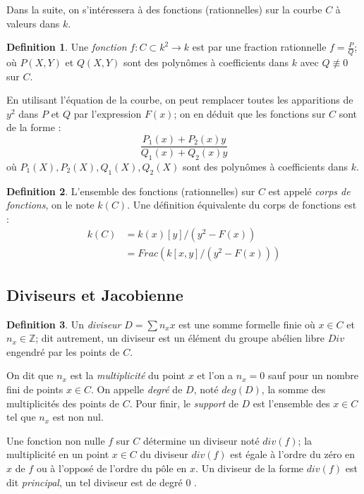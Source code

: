 \documentclass[a4paper]{article}
\theoremstyle{definition}
\newtheorem{definition}{Definition}[section]
\theoremstyle{remark}
\numberwithin{equation}{section}
\begin{document}
Dans la suite, on s'intéressera à des fonctions (rationnelles) sur la courbe $C$ à valeurs dans $k$.
\begin{definition}
Une \emph{fonction} $f : C \subset k^2 \longrightarrow k$ est par une fraction rationnelle $f = \frac{P}{Q}$; où $P(X,Y)$ et $Q(X,Y)$ sont des polynômes à coefficients dans $k$ avec $Q \not\equiv 0$ sur $C$.
\end{definition}

En utilisant l'équation de la courbe, on peut remplacer toutes les apparitions de $y^2$ dans $P$ et $Q$ par l'expression $F(x)$; on en déduit que les fonctions sur $C$ sont de la forme :
$$\frac{P_1(x) + P_2(x)y}{Q_1(x) + Q_2(x)y}$$
où $P_1(X),P_2(X),Q_1(X),Q_2(X)$ sont des polynômes à coefficients dans $k$.

\begin{definition}
L'ensemble des fonctions (rationnelles) sur $C$ est appelé \emph{corps de fonctions}, on le note $k(C)$. Une définition équivalente du corps de fonctions est :
\begin{align*}
k(C) &= k(x)[y]/(y^2-F(x)) \\
	 &= Frac(k[x,y]/(y^2-F(x)))
\end{align*}
\end{definition}

\subsection{Diviseurs et Jacobienne}

\begin{definition}
Un \emph{diviseur} $D = \sum n_x x$ est une somme formelle finie où $x \in C$ et $n_x \in \mathbb{Z}$; dit autrement, un diviseur est un élément du groupe abélien libre $Div$ engendré par les points de $C$.

On dit que $n_x$ est la \emph{multiplicité} du point $x$ et l'on a $n_x = 0$ sauf pour un nombre fini de points $x \in C$. On appelle \emph{degré} de $D$, noté $deg(D)$, la somme des multiplicités des points de $C$. Pour finir, le \emph{support} de $D$ est l'ensemble des $x \in C$ tel que $n_x$ est non nul.
\end{definition}

Une fonction non nulle $f$ sur $C$ détermine un diviseur noté $div(f)$; la multiplicité en un point $x \in C$ du diviseur $div(f)$ est égale à l'ordre du zéro en $x$ de $f$ ou à l'opposé de l'ordre du pôle en $x$. Un diviseur de la forme $div(f)$ est dit \emph{principal}, un tel diviseur est de degré 0 \citep{menezes}.
\end{document}
